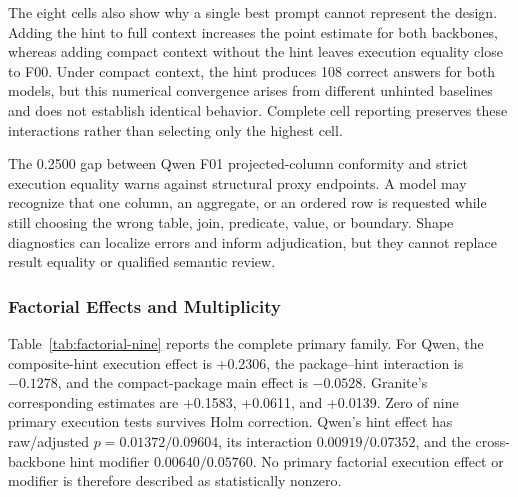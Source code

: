 \documentclass[applsci,article,submit,moreauthors]{Definitions/mdpi}
\begin{document}
The eight cells also show why a single best prompt cannot represent the design. Adding the hint to full context increases the point estimate for both backbones, whereas adding compact context without the hint leaves execution equality close to F00. Under compact context, the hint produces 108 correct answers for both models, but this numerical convergence arises from different unhinted baselines and does not establish identical behavior. Complete cell reporting preserves these interactions rather than selecting only the highest cell.

The 0.2500 gap between Qwen F01 projected-column conformity and strict execution equality warns against structural proxy endpoints. A model may recognize that one column, an aggregate, or an ordered row is requested while still choosing the wrong table, join, predicate, value, or boundary. Shape diagnostics can localize errors and inform adjudication, but they cannot replace result equality or qualified semantic review.

\subsubsection{Factorial Effects and Multiplicity}

Table~\ref{tab:factorial-nine} reports the complete primary family. For Qwen, the composite-hint execution effect is +0.2306, the package--hint interaction is $-0.1278$, and the compact-package main effect is $-0.0528$. Granite's corresponding estimates are +0.1583, +0.0611, and +0.0139. Zero of nine primary execution tests survives Holm correction. Qwen's hint effect has raw/adjusted $p=0.01372/0.09604$, its interaction $0.00919/0.07352$, and the cross-backbone hint modifier $0.00640/0.05760$. No primary factorial execution effect or modifier is therefore described as statistically nonzero.
\end{document}
